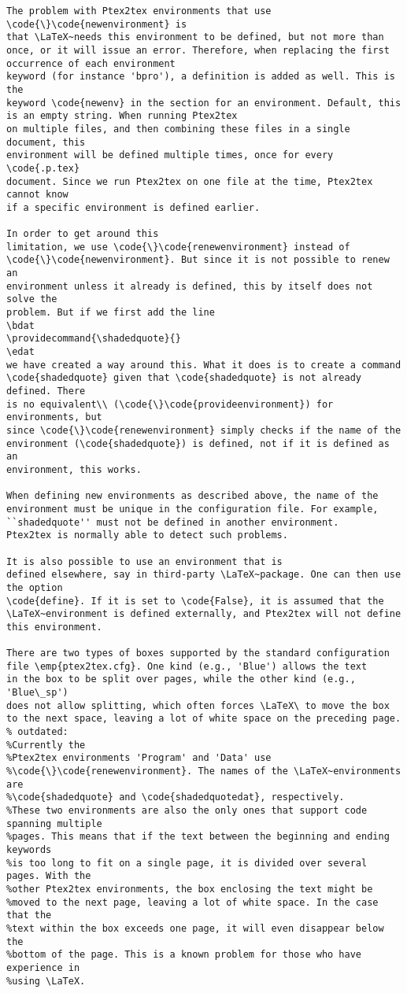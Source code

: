 \documentclass[a4paper,11pt]{article}
\begin{document}
{{{{{{{{{{{\begin{Verbatim}
The problem with Ptex2tex environments that use \code{\}\code{newenvironment} is
that \LaTeX~needs this environment to be defined, but not more than
once, or it will issue an error. Therefore, when replacing the first occurrence of each environment
keyword (for instance 'bpro'), a definition is added as well. This is the
keyword \code{newenv} in the section for an environment. Default, this
is an empty string. When running Ptex2tex
on multiple files, and then combining these files in a single document, this
environment will be defined multiple times, once for every \code{.p.tex}
document. Since we run Ptex2tex on one file at the time, Ptex2tex cannot know
if a specific environment is defined earlier. 

In order to get around this
limitation, we use \code{\}\code{renewenvironment} instead of
\code{\}\code{newenvironment}. But since it is not possible to renew an
environment unless it already is defined, this by itself does not solve the
problem. But if we first add the line
\bdat
\providecommand{\shadedquote}{}
\edat
we have created a way around this. What it does is to create a command
\code{shadedquote} given that \code{shadedquote} is not already defined. There
is no equivalent\\ (\code{\}\code{provideenvironment}) for environments, but
since \code{\}\code{renewenvironment} simply checks if the name of the
environment (\code{shadedquote}) is defined, not if it is defined as an
environment, this works. 

When defining new environments as described above, the name of the
environment must be unique in the configuration file. For example,
``shadedquote'' must not be defined in another environment.
Ptex2tex is normally able to detect such problems.

It is also possible to use an environment that is
defined elsewhere, say in third-party \LaTeX~package. One can then use the option
\code{define}. If it is set to \code{False}, it is assumed that the
\LaTeX~environment is defined externally, and Ptex2tex will not define
this environment. 

There are two types of boxes supported by the standard configuration
file \emp{ptex2tex.cfg}. One kind (e.g., 'Blue') allows the text 
in the box to be split over pages, while the other kind (e.g., 'Blue\_sp')
does not allow splitting, which often forces \LaTeX\ to move the box
to the next space, leaving a lot of white space on the preceding page.
% outdated:
%Currently the
%Ptex2tex environments 'Program' and 'Data' use
%\code{\}\code{renewenvironment}. The names of the \LaTeX~environments are
%\code{shadedquote} and \code{shadedquotedat}, respectively.
%These two environments are also the only ones that support code spanning multiple
%pages. This means that if the text between the beginning and ending keywords
%is too long to fit on a single page, it is divided over several pages. With the
%other Ptex2tex environments, the box enclosing the text might be
%moved to the next page, leaving a lot of white space. In the case that the
%text within the box exceeds one page, it will even disappear below the
%bottom of the page. This is a known problem for those who have experience in
%using \LaTeX. 


\end{Verbatim}}}}}}}}}}}}
\end{document}
